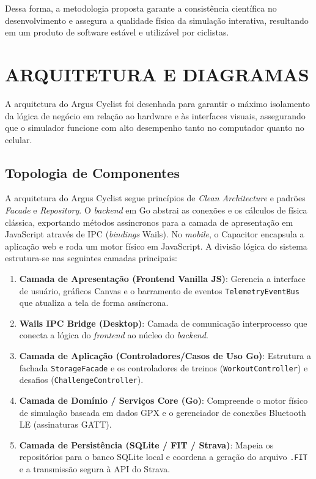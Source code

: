 \documentclass[
    a4paper,
    12pt,
    oneside,
    english,
    brazil,
    chapter=TITLE,
    section=TITLE,
]{abntex2}
\begin{document}
Dessa forma, a metodologia proposta garante a consistência científica no desenvolvimento e assegura a qualidade física da simulação interativa, resultando em um produto de software estável e utilizável por ciclistas.

\chapter{ARQUITETURA E DIAGRAMAS}
\label{sec:arquitetura}

A arquitetura do Argus Cyclist foi desenhada para garantir o máximo isolamento da lógica de negócio em relação ao hardware e às interfaces visuais, assegurando que o simulador funcione com alto desempenho tanto no computador quanto no celular.

\section{Topologia de Componentes}
\label{sec:topologia}

A arquitetura do Argus Cyclist segue princípios de \textit{Clean Architecture} e padrões \textit{Facade} e \textit{Repository}. O \textit{backend} em Go abstrai as conexões e os cálculos de física clássica, exportando métodos assíncronos para a camada de apresentação em JavaScript através de IPC (\textit{bindings} Wails). No \textit{mobile}, o Capacitor encapsula a aplicação web e roda um motor físico em JavaScript. A divisão lógica do sistema estrutura-se nas seguintes camadas principais:

\begin{enumerate}
    \item \textbf{Camada de Apresentação (Frontend Vanilla JS)}: Gerencia a interface de usuário, gráficos Canvas e o barramento de eventos \texttt{TelemetryEventBus} que atualiza a tela de forma assíncrona.
    \item \textbf{Wails IPC Bridge (Desktop)}: Camada de comunicação interprocesso que conecta a lógica do \textit{frontend} ao núcleo do \textit{backend}.
    \item \textbf{Camada de Aplicação (Controladores/Casos de Uso Go)}: Estrutura a fachada \texttt{StorageFacade} e os controladores de treinos (\texttt{WorkoutController}) e desafios (\texttt{ChallengeController}).
    \item \textbf{Camada de Domínio / Serviços Core (Go)}: Compreende o motor físico de simulação baseada em dados GPX e o gerenciador de conexões Bluetooth LE (assinaturas GATT).
    \item \textbf{Camada de Persistência (SQLite / FIT / Strava)}: Mapeia os repositórios para o banco SQLite local e coordena a geração do arquivo \texttt{.FIT} e a transmissão segura à API do Strava.
\end{enumerate}
\end{document}
